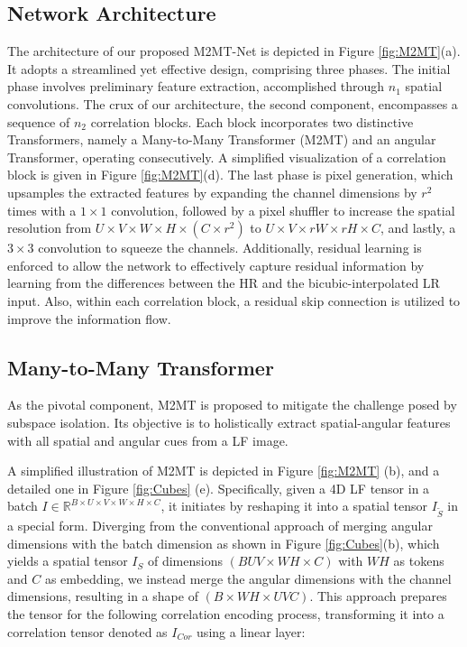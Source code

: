 \subsection{Network Architecture}
The architecture of our proposed M2MT-Net is depicted in Figure \ref{fig:M2MT}(a). It adopts a streamlined yet effective design, comprising three phases. The initial phase involves preliminary feature extraction, accomplished through $n_1$ spatial convolutions. The crux of our architecture, the second component, encompasses a sequence of $n_2$ correlation blocks. Each block incorporates two distinctive Transformers, namely a Many-to-Many Transformer (M2MT) and an angular Transformer, operating consecutively. A simplified visualization of a correlation block is given in Figure \ref{fig:M2MT}(d). The last phase is pixel generation, which upsamples the extracted features by expanding the channel dimensions by $r^2$ times with a $1 \times 1$ convolution, followed by a pixel shuffler to increase the spatial resolution from $U \times V \times W \times H \times (C \times r^2)$ to $U \times V \times rW \times rH \times C$, and lastly, a $3 \times 3$ convolution to squeeze the channels. Additionally, residual learning is enforced to allow the network to effectively capture residual information by learning from the differences between the HR and the bicubic-interpolated LR input. Also, within each correlation block, a residual skip connection is utilized to improve the information flow.

\subsection{Many-to-Many Transformer}
As the pivotal component, M2MT is proposed to mitigate the challenge posed by subspace isolation. Its objective is to holistically extract spatial-angular features with all spatial and angular cues from a LF image.

A simplified illustration of M2MT is depicted in Figure \ref{fig:M2MT} (b), and a detailed one in Figure \ref{fig:Cubes} (e). Specifically, given a 4D LF tensor in a batch $I \in \mathbb{R}^{B \times U \times V \times W \times H \times C}$, it initiates by reshaping it into a spatial tensor $I_{\tilde{S}}$ in a special form. Diverging from the conventional approach of merging angular dimensions with the batch dimension as shown in Figure \ref{fig:Cubes}(b), which yields a spatial tensor $I_{S}$ of dimensions $(BUV \times WH \times C)$ with $WH$ as tokens and $C$ as embedding, we instead merge the angular dimensions with the channel dimensions, resulting in a shape of $(B \times WH \times UVC)$. This approach prepares the tensor for the following correlation encoding process, transforming it into a correlation tensor denoted as $I_{Cor}$ using a linear layer:

